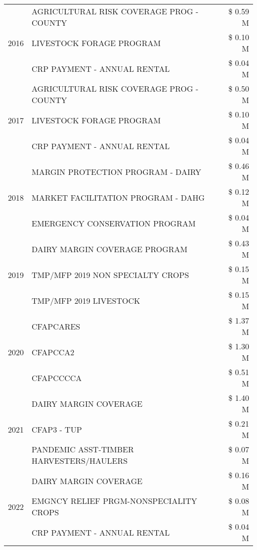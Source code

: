 \begin{tabular}{llr}
\multirow[t]{3}{*}{2016} & AGRICULTURAL RISK COVERAGE PROG - COUNTY & \$ 0.59 M \\
 & LIVESTOCK FORAGE PROGRAM & \$ 0.10 M \\
 & CRP PAYMENT - ANNUAL RENTAL & \$ 0.04 M \\
\cline{1-3}
\multirow[t]{3}{*}{2017} & AGRICULTURAL RISK COVERAGE PROG - COUNTY & \$ 0.50 M \\
 & LIVESTOCK FORAGE PROGRAM & \$ 0.10 M \\
 & CRP PAYMENT - ANNUAL RENTAL & \$ 0.04 M \\
\cline{1-3}
\multirow[t]{3}{*}{2018} & MARGIN PROTECTION PROGRAM - DAIRY & \$ 0.46 M \\
 & MARKET FACILITATION PROGRAM - DAHG & \$ 0.12 M \\
 & EMERGENCY CONSERVATION PROGRAM & \$ 0.04 M \\
\cline{1-3}
\multirow[t]{3}{*}{2019} & DAIRY MARGIN COVERAGE PROGRAM & \$ 0.43 M \\
 & TMP/MFP 2019 NON SPECIALTY CROPS & \$ 0.15 M \\
 & TMP/MFP 2019 LIVESTOCK & \$ 0.15 M \\
\cline{1-3}
\multirow[t]{3}{*}{2020} & CFAPCARES & \$ 1.37 M \\
 & CFAPCCA2 & \$ 1.30 M \\
 & CFAPCCCCA & \$ 0.51 M \\
\cline{1-3}
\multirow[t]{3}{*}{2021} & DAIRY MARGIN COVERAGE & \$ 1.40 M \\
 & CFAP3 - TUP & \$ 0.21 M \\
 & PANDEMIC ASST-TIMBER HARVESTERS/HAULERS & \$ 0.07 M \\
\cline{1-3}
\multirow[t]{3}{*}{2022} & DAIRY MARGIN COVERAGE & \$ 0.16 M \\
 & EMGNCY RELIEF PRGM-NONSPECIALITY CROPS & \$ 0.08 M \\
 & CRP PAYMENT - ANNUAL RENTAL & \$ 0.04 M \\
\cline{1-3}
\bottomrule
\end{tabular}
